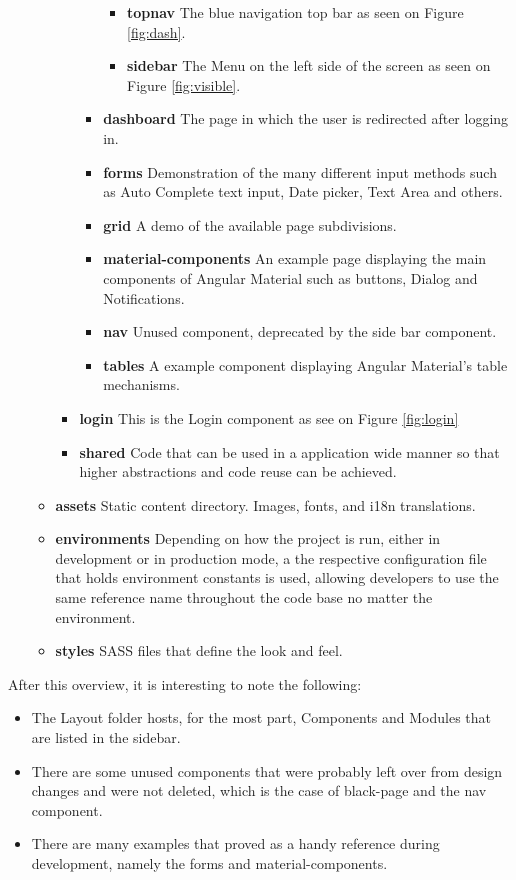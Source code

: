 \begin{itemize}
\begin{itemize}
\begin{itemize}
\begin{itemize}
\begin{itemize}
        \item \textbf{topnav} The blue navigation top bar as seen on Figure \ref{fig:dash}.
        \item \textbf{sidebar} The Menu on the left side of the screen as seen on Figure \ref{fig:visible}.
        \end{itemize}
      \item \textbf{dashboard} The page in which the user is redirected after logging in.
      \item \textbf{forms} Demonstration of the many different input methods such as Auto Complete text input, Date picker, Text Area and others.
      \item \textbf{grid} A demo of the available page subdivisions.
      \item \textbf{material-components} An example page displaying the main components of Angular Material such as buttons, Dialog and Notifications.
      \item \textbf{nav} Unused component, deprecated by the side bar component.
      \item \textbf{tables} A example component displaying Angular Material's table mechanisms.
      \end{itemize}

    \item \textbf{login} This is the Login component as see on Figure \ref{fig:login}
    \item \textbf{shared} Code that can be used in a application wide manner so that higher abstractions and code reuse can be achieved.
    \end{itemize}
  \item \textbf{assets} Static content directory. Images, fonts, and i18n translations.
  \item \textbf{environments} Depending on how the project is run, either in development or in production mode, a the respective configuration file that holds environment constants is used, allowing developers to use the same reference name throughout the code base no matter the environment.
  \item \textbf{styles} \gls{SASS} files that define the look and feel.
  \end{itemize}
\end{itemize}

After this overview, it is interesting to note the following:
\begin{itemize}
\item The Layout folder hosts, for the most part, Components and Modules that are listed in the sidebar.\item There are some unused components that were probably left over from design changes and were not deleted, which is the case of black-page and the nav component.
\item There are many examples that proved as a handy reference during development, namely the forms and material-components.
\end{itemize}


